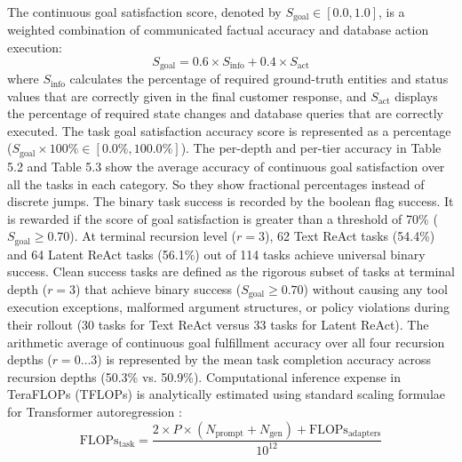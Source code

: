 \documentclass[a4paper, 12pt]{report}
\begin{document}
The continuous goal satisfaction score, denoted by $S_{\text{goal}} \in [0.0, 1.0]$, is a weighted combination of communicated factual accuracy and database action execution:
\begin{equation}
    S_{\text{goal}} = 0.6 \times S_{\text{info}} + 0.4 \times S_{\text{act}}
\end{equation}
where $S_{\text{info}}$ calculates the percentage of required ground-truth entities and status values that are correctly given in the final customer response, and $S_{\text{act}}$ displays the percentage of required state changes and database queries that are correctly executed. The task goal satisfaction accuracy score is represented as a percentage ($S_{\text{goal}} \times 100\% \in [0.0\%, 100.0\%]$). The per-depth and per-tier accuracy in Table 5.2 and Table 5.3 show the average accuracy of continuous goal satisfaction over all the tasks in each category. So they show fractional percentages instead of discrete jumps. The binary task success is recorded by the boolean flag success. It is rewarded if the score of goal satisfaction is greater than a threshold of 70\% ($S_{\text{goal}} \ge 0.70$). At terminal recursion level ($r=3$), 62 Text ReAct tasks (54.4\%) and 64 Latent ReAct tasks (56.1\%) out of 114 tasks achieve universal binary success. Clean success tasks are defined as the rigorous subset of tasks at terminal depth ($r=3$) that achieve binary success ($S_{\text{goal}} \ge 0.70$) without causing any tool execution exceptions, malformed argument structures, or policy violations during their rollout (30 tasks for Text ReAct versus 33 tasks for Latent ReAct). The arithmetic average of continuous goal fulfillment accuracy over all four recursion depths ($r=0\dots3$) is represented by the mean task completion accuracy across recursion depths (50.3\% vs. 50.9\%).
Computational inference expense in TeraFLOPs (TFLOPs) is analytically estimated using standard scaling formulae for Transformer autoregression \cite{vaswani2017attention}:
\begin{equation}
    \text{FLOPs}_{\text{task}} = \frac{2 \times P \times (N_{\text{prompt}} + N_{\text{gen}}) + \text{FLOPs}_{\text{adapters}}}{10^{12}}
\end{equation}
\end{document}
